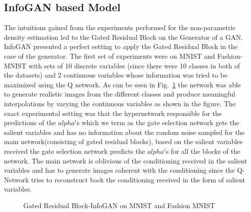 \documentclass[10pt,twocolumn,letterpaper]{article}
\def\figref#1{Fig.~\ref{#1}}
\begin{document}
\subsection{InfoGAN based Model}
The intuitions gained from the experiments performed for the non-parametric density estimation led to the Gated Residual Block on the Generator of a GAN. InfoGAN \cite{chen2016infogan} presented a perfect setting to apply the Gated Residual Block in the case of the generator. The first set of experiments were on MNIST and Fashion-MNIST with sets of 10 discrete variables (since there were 10 classes in both of the datasets) and 2 continuous variables whose information was tried to be maximized using the Q network. As can be seen in \figref{fig:infogan_unconditional} the network was able to generate realistic images from the different classes and produce meaningful interpolations by varying the continuous variables as shown in the figure. The exact experimental setting was that the hypernetwork responsible for the predictions of the $alpha^i$s which we term as the gate selection network gets the salient variables and has no information about the random noise sampled for the main network(consisting of gated residual blocks), based on the salient variables received the gate selection network predicts the  $alpha^i$s for all the blocks of the network. The main network is oblivious of the conditioning received in the salient variables and has to generate images coherent with the conditioning since the Q-Network tries to reconstruct back the conditioning received in the form of salient variables. 

\begin{figure}%
    \centering
    \caption{Gated Residual Block-InfoGAN on MNIST and Fashion MNIST}
    \label{fig:infogan_unconditional}
    \vspace{-3mm}
\end{figure}
\end{document}
